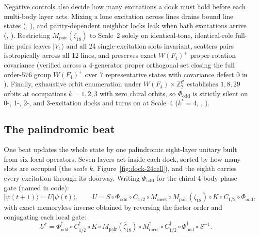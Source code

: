 Negative controls also decide how many excitations a dock must hold before each multi-body layer acts. Mixing a lone
excitation across lines drains bound line states (, ), and parity-dependent neighbor
locks leak when bath excitations arrive (, ). Restricting $M_{\mathrm{pair}}(\zeta_{18})$ to
Scale~2 solely on identical-tone, identical-role full-line pairs leaves $|V_1\rangle$ and all 24 single-excitation
slots invariant, scatters pairs isotropically across all 12 lines, and preserves exact $W(F_4)^+$ proper-rotation
covariance (verified across a 4-generator proper orthogonal set closing the full order-576 group $W(F_4)^+$ over 7
representative states with covariance defect $0$ in \universecode). Finally, exhaustive orbit enumeration under
$W(F_4) \times \mathbb{Z}_2^{\mathcal{C}}$ establishes $1, 8, 29$ orbits at occupations $k = 1, 2, 3$ with zero chiral
orbits, so $\Phi_{\mathrm{odd}}$ is strictly silent on 0-, 1-, 2-, and 3-excitation docks and turns on at Scale~4
($k^* = 4$, \universecode, ).

\subsection{The palindromic beat}

One beat updates the whole state by one palindromic eight-layer unitary built from six local operators. Seven layers act inside each dock, sorted by how many slots are occupied (the
\emph{scale} $k$, Figure~\ref{fig:dock-24cell}), and the eighth carries every excitation through its doorway. Writing
$\Phi_{\mathrm{odd}}$ for the chiral 4-body phase gate (named  in code):
\begin{equation}
|\psi(t+1)\rangle = U |\psi(t)\rangle,
\qquad
U = S \circ \Phi_{\mathrm{odd}} \circ C_{1/2} \circ M_{\mathrm{meet}} \circ M_{\mathrm{pair}}(\zeta_{18}) \circ K \circ C_{1/2} \circ \Phi_{\mathrm{odd}},
\label{eq:beat}
\end{equation}
with exact memoryless inverse obtained by reversing the factor order and conjugating each local gate:
\begin{equation}
U^\dagger = \Phi_{\mathrm{odd}}^\dagger \circ C_{1/2}^\dagger \circ K \circ M_{\mathrm{pair}}(\overline{\zeta}_{18})
\circ M_{\mathrm{meet}}^\dagger \circ C_{1/2}^\dagger \circ \Phi_{\mathrm{odd}}^\dagger \circ S^{-1}.
\label{eq:beat-dag}
\end{equation}

